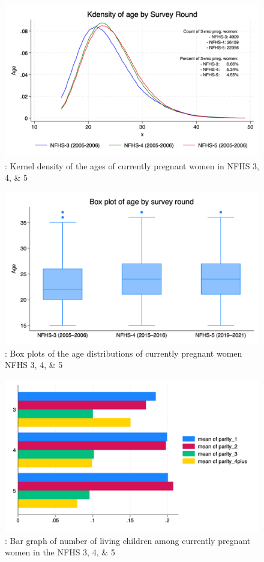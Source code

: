\documentclass{article}
\begin{document}
\begin{figure}[H]
    \centering
    \includegraphics[width=\textwidth]{figures/kdensities ages.png}
    \caption{: Kernel density of the ages of currently pregnant women in NFHS 3, 4, \& 5}
\end{figure}


\begin{figure}[H]
    \centering
    \includegraphics[width=\textwidth]{figures/boxplots ages.png}
    \caption{: Box plots of the age distributions of currently pregnant women NFHS 3, 4, \& 5}
\end{figure}

\begin{figure}[H]
    \centering
    \includegraphics[width=\textwidth]{figures/bar graph number of children.png}
    \caption{: Bar graph of number of living children among currently pregnant women in the NFHS 3, 4, \& 5}
\end{figure}
\end{document}
